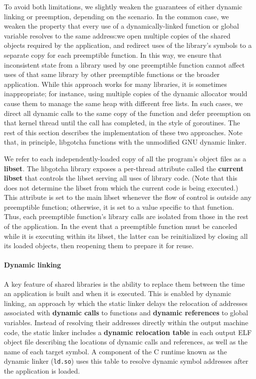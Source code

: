 To avoid both limitations, we slightly weaken the guarantees of either dynamic
linking or preemption, depending on the scenario.  In the common case, we weaken the
property that every use of a dynamically-linked function or global variable resolves
to the same address:\@ we open multiple copies of the shared objects required by the
application, and redirect uses of the library's symbols to a separate copy for each
preemptible function.  In this way, we ensure that inconsistent state from a library
used by one preemptible function cannot affect uses of that same library by other
preemptible functions or the broader application.  While this approach works for many
libraries, it is sometimes inappropriate; for instance, using multiple copies of the
dynamic allocator would cause them to manage the same heap with different free lists.
In such cases, we direct all dynamic calls to the same copy of the function and defer
preemption on that kernel thread until the call has completed, in the style of
goroutines.
The rest of this section describes the implementation of these two approaches.  Note
that, in principle, libgotcha functions with the unmodified GNU dynamic linker.


We refer to each independently-loaded copy of all the program's object files as a
\textbf{libset}.  The libgotcha library exposes a per-thread attribute called the
\textbf{current libset} that controls the libset serving all uses of library code.
(Note that this does not determine the libset from which the current code is being
executed.)   This attribute is set to the main libset whenever the flow of control is
outside any preemptible function; otherwise, it is set to a value specific to that
function.  Thus, each preemptible function's library calls are isolated from those in
the rest of the application.  In the event that a preemptible function must be
canceled while it is executing within its libset, the latter can be reinitialized by
closing all its loaded objects, then reopening them to prepare it for reuse.

\paragraph{Dynamic linking}

A key feature of shared libraries is the ability to replace them between the time an
application is built and when it is executed.  This is enabled by dynamic linking, an
approach by which the static linker delays the relocation of addresses associated
with \textbf{dynamic calls} to functions and \textbf{dynamic references} to global
variables.  Instead of resolving their addresses directly within the output machine
code, the static linker includes a
\textbf{dynamic relocation table} in each output ELF object file describing the
locations of dynamic calls and references, as well as the name of each target symbol.
A component of the C runtime known as the dynamic linker (\texttt{ld.so}) uses this
table to resolve dynamic symbol addresses after the application is loaded.

